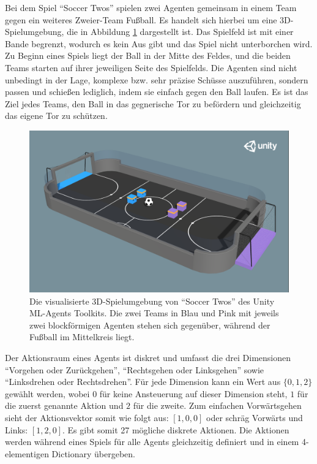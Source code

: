 Bei dem Spiel \enquote{Soccer Twos} spielen zwei Agenten gemeinsam in einem Team gegen ein weiteres Zweier-Team Fußball. Es handelt sich hierbei um eine 3D-Spielumgebung, die in Abbildung \ref{fig:soccer_twos_3d} dargestellt ist. Das Spielfeld ist mit einer Bande begrenzt, wodurch es kein Aus gibt und das Spiel nicht unterborchen wird. Zu Beginn eines Spiels liegt der Ball in der Mitte des Feldes, und die beiden Teams starten auf ihrer jeweiligen Seite des Spielfelds. Die Agenten sind nicht unbedingt in der Lage, komplexe bzw. sehr präzise Schüsse auszuführen, sondern passen und schießen lediglich, indem sie einfach gegen den Ball laufen. Es ist das Ziel jedes Teams, den Ball in das gegnerische Tor zu befördern und gleichzeitig das eigene Tor zu schützen.

\begin{figure}[h]
	\centering
	\includegraphics[width=\textwidth]{img/soccer_twos.png}
	\caption{Die visualisierte 3D-Spielumgebung von \enquote{Soccer Twos} des Unity \ac{ML}-Agents Toolkits. Die zwei Teams in Blau und Pink mit jeweils zwei blockförmigen Agenten stehen sich gegenüber, während der Fußball im Mittelkreis liegt. \cite{juliani2020}}
	\label{fig:soccer_twos_3d}
\end{figure}

Der Aktionsraum eines Agents ist diskret und umfasst die drei Dimensionen \enquote{Vorgehen oder Zurückgehen}, \enquote{Rechtsgehen oder Linksgehen} sowie \enquote{Linksdrehen oder Rechtsdrehen}. Für jede Dimension kann ein Wert aus \(\{0,1, 2\}\) gewählt werden, wobei \(0\) für keine Ansteuerung auf dieser Dimension steht, \(1\) für die zuerst genannte Aktion und \(2\) für die zweite. Zum einfachen Vorwärtsgehen sieht der Aktionsvektor somit wie folgt aus: \([1, 0, 0]\) oder schräg Vorwärts und Links: \([1, 2, 0]\). Es gibt somit 27 mögliche diskrete Aktionen.
Die Aktionen werden während eines Spiels für alle Agents gleichzeitig definiert und in einem 4-elementigen Dictionary übergeben.

